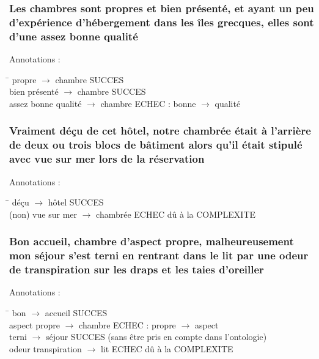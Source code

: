 \documentclass[smaller]{beamer}
\begin{document}
\begin{frame}
\frametitle{Les chambres sont propres et bien présenté, et ayant un peu d'expérience d'hébergement dans les îles grecques, elles sont d'une assez bonne qualité}
\begin{block}{Annotations :}
\begin{tabbing}
\hspace{6cm}\=\kill
propre $\rightarrow$ chambre               \> SUCCES\\
bien présenté $\rightarrow$ chambre        \> SUCCES\\
assez bonne qualité $\rightarrow$ chambre  \> ECHEC : bonne $\rightarrow$ qualité
\end{tabbing}
\end{block}
\end{frame}


\begin{frame}
\frametitle{Vraiment déçu de cet hôtel, notre chambrée était à l'arrière de deux ou trois blocs de bâtiment alors qu'il était stipulé avec vue sur mer lors de la réservation}
\begin{block}{Annotations :}
\begin{tabbing}
\hspace{6cm}\=\kill
déçu $\rightarrow$ hôtel                   \> SUCCES\\
(non) vue sur mer $\rightarrow$ chambrée    \> ECHEC dû à la COMPLEXITE
\end{tabbing}
\end{block}
\end{frame}


\begin{frame}
\frametitle{Bon accueil, chambre d'aspect propre, malheureusement mon séjour s'est terni en rentrant dans le lit par une odeur de transpiration sur les draps et les taies d'oreiller}
\begin{block}{Annotations :}
\begin{tabbing}
\hspace{6cm}\=\kill
bon $\rightarrow$ accueil                  \> SUCCES\\
aspect propre $\rightarrow$ chambre        \> ECHEC : propre $\rightarrow$ aspect\\
terni $\rightarrow$ séjour                 \> SUCCES (sans être pris en compte dans l'ontologie)\\
odeur transpiration $\rightarrow$ lit      \> ECHEC dû à la COMPLEXITE
\end{tabbing}
\end{block}
\end{frame}
\end{document}
